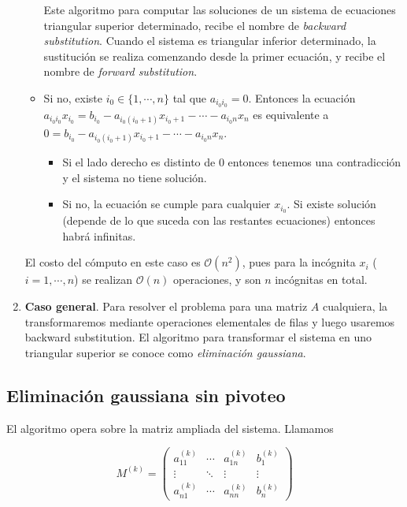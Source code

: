 \begin{enumerate}
\begin{itemize}
Este algoritmo para computar las soluciones de un sistema de ecuaciones triangular superior determinado, recibe el nombre de \textit{backward substitution}. Cuando el sistema es triangular inferior determinado, la sustitución se realiza comenzando desde la primer ecuación, y recibe el nombre de \textit{forward substitution}.

\item Si no, existe $i_0 \in \{1, \cdots, n\}$ tal que $a_{i_0i_0} = 0$. Entonces la ecuación $a_{i_0i_0} x_{i_0} = b_{i_0} - a_{i_0(i_0 + 1)} x_{i_0+1} - \cdots - a_{i_0n} x_n$ es equivalente a $0 = b_{i_0} - a_{i_0(i_0 + 1)} x_{i_0+1} - \cdots - a_{i_0n} x_n$.
\begin{itemize}
\item Si el lado derecho es distinto de 0 entonces tenemos una contradicción y el sistema no tiene solución.
\item Si no, la ecuación se cumple para cualquier $x_{i_0}$. Si existe solución (depende de lo que suceda con las restantes ecuaciones) entonces habrá infinitas.
\end{itemize}


\end{itemize}

El costo del cómputo en este caso es $\mathcal{O}(n^2)$, pues para la incógnita $x_i$ ($i = 1, \cdots, n$) se realizan $\mathcal{O}(n)$ operaciones, y son $n$ incógnitas en total.

\item \textbf{Caso general}. Para resolver el problema para una matriz $A$ cualquiera, la transformaremos mediante operaciones elementales de filas y luego usaremos backward substitution. El algoritmo para transformar el sistema en uno triangular superior se conoce como \textit{eliminación gaussiana}.\\

\end{enumerate}

\subsection{Eliminación gaussiana sin pivoteo}

El algoritmo opera sobre la matriz ampliada del sistema. Llamamos

\[M^{(k)} = \left(\begin{array}{ccc|c}
a_{11}^{(k)} & \cdots & a_{1n}^{(k)} & b_1^{(k)}\\
\vdots & \ddots & \vdots & \vdots\\
a_{n1}^{(k)} & \cdots & a_{nn}^{(k)} & b_n^{(k)}
\end{array}\right)\]

